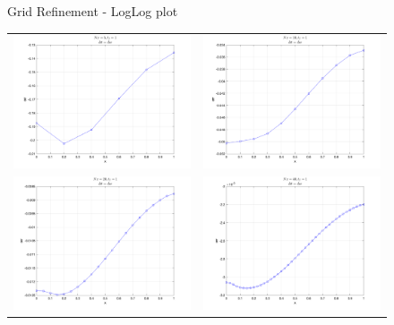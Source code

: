 \documentclass[11pt]{article}
\begin{document}
\begin{enumerate}
\begin{enumerate}
\begin{figure}[htp]
      \caption{Grid Refinement - LogLog plot}
      \label{fig:q1_1}
      \end{figure}
      
      \begin{figure}[htp]
      \centering
      \begin{tabular}{cc}
      \includegraphics[width=3.3in]{ErrVx_1.png} & \includegraphics[width=3.3in]{ErrVx_2.png} \\
      \includegraphics[width=3.3in]{ErrVx_3.png} & \includegraphics[width=3.3in]{ErrVx_4.png}\\

\end{tabular}
\end{figure}
\end{enumerate}
\end{enumerate}
\end{document}
